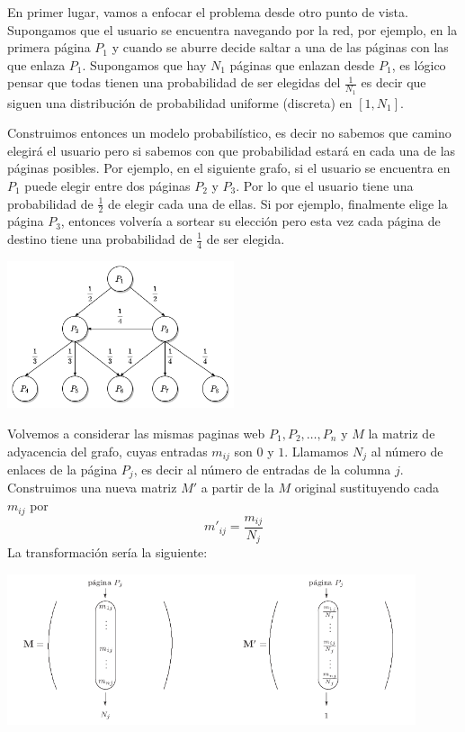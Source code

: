 \documentclass[size=a4, parskip=half, titlepage=false, toc=flat, toc=bib, 12pt, twoside]{scrartcl}
\theoremstyle{theorem-style}
\theoremstyle{definition-style}
\theoremstyle{remark-style}
\theoremstyle{example-style}
\theoremstyle{definition-style}
\theoremstyle{remark-style}
\begin{document}
En primer lugar, vamos a enfocar el problema desde otro punto de vista. Supongamos que el usuario se encuentra navegando por la red, por ejemplo, en la primera página $P_1$ y cuando se aburre decide saltar a una de las páginas con las que enlaza $P_1$. Supongamos que hay $N_1$ páginas que enlazan desde $P_1$, es lógico pensar que todas tienen una probabilidad de ser elegidas del $\frac{1}{N_1}$ es decir que siguen una distribución de probabilidad uniforme (discreta) en $[1, N_1]$.

Construimos entonces un modelo probabilístico, es decir no sabemos que camino elegirá el usuario pero si sabemos con que probabilidad estará en cada una de las páginas posibles. Por ejemplo, en el siguiente grafo, si el usuario se encuentra en $P_1$ puede elegir entre dos páginas $P_2$ y $P_3$. Por lo que el usuario tiene una probabilidad de $\frac{1}{2}$ de elegir cada una de ellas. Si por ejemplo, finalmente elige la página $P_3$, entonces volvería a sortear su elección pero esta vez cada página de destino tiene una probabilidad de $\frac{1}{4}$ de ser elegida.

\begin{center}
\includegraphics[width=0.5\textwidth]{./img/grafoprob}
\end{center}

Volvemos a considerar las mismas paginas web $P_1, P_2, \dots, P_n$ y $M$ la matriz de adyacencia del grafo, cuyas entradas $m_{ij}$ son $0$ y $1$. Llamamos $N_j$ al número de enlaces de la página $P_j$,  es decir al número de entradas de la columna $j$. Construimos una nueva matriz $M'$ a partir de la $M$ original sustituyendo cada $m_{ij}$ por
$$m'_{ij} = \frac{m_{ij}}{N_j} $$
La transformación sería la siguiente:

\begin{center}
\includegraphics[width=0.9\textwidth]{./img/markov}
\end{center}
\end{document}
